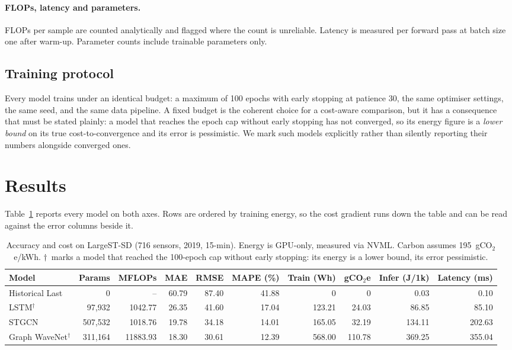 \documentclass[manuscript,screen,review]{acmart}
\begin{document}
\paragraph{FLOPs, latency and parameters.} FLOPs per sample are counted
analytically and flagged where the count is unreliable. Latency is
measured per forward pass at batch size one after warm-up. Parameter
counts include trainable parameters only.

\subsection{Training protocol}
Every model trains under an identical budget: a maximum of 100 epochs with
early stopping at patience 30, the same optimiser settings, the same seed,
and the same data pipeline. A fixed budget is the coherent choice for a
cost-aware comparison, but it has a consequence that must be stated
plainly: a model that reaches the epoch cap without early stopping has not
converged, so its energy figure is a \emph{lower bound} on its true
cost-to-convergence and its error is pessimistic. We mark such models
explicitly rather than silently reporting their numbers alongside
converged ones.

\section{Results}

Table~\ref{tab:main} reports every model on both axes. Rows are ordered by
training energy, so the cost gradient runs down the table and can be read
against the error columns beside it.

\begin{table}[t]
\centering
\caption{Accuracy and cost on LargeST-SD (716 sensors, 2019, 15-min). Energy is GPU-only, measured via NVML. Carbon assumes 195~gCO$_2$e/kWh. $\dag$~marks a model that reached the 100-epoch cap without early stopping: its energy is a lower bound, its error pessimistic.}
\label{tab:main}
\begin{tabular}{lrrrrrrrrr}
\toprule
Model & Params & MFLOPs & MAE & RMSE & MAPE (\%) & Train (Wh) & gCO$_2$e & Infer (J/1k) & Latency (ms) \\
\midrule
Historical Last & 0 & -- & 60.79 & 87.40 & 41.88 & 0 & 0 & 0.03 & 0.10 \\
LSTM$^{\dag}$ & 97,932 & 1042.77 & 26.35 & 41.60 & 17.04 & 123.21 & 24.03 & 86.85 & 85.10 \\
STGCN & 507,532 & 1018.76 & 19.78 & 34.18 & 14.01 & 165.05 & 32.19 & 134.11 & 202.63 \\
Graph WaveNet$^{\dag}$ & 311,164 & 11883.93 & 18.30 & 30.61 & 12.39 & 568.00 & 110.78 & 369.25 & 355.04 \\
\bottomrule
\end{tabular}
\end{table}
\end{document}
